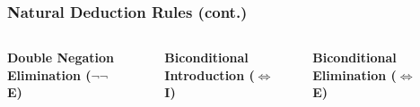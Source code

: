 \documentclass{beamer}
\begin{document}
  \begin{frame}
  \frametitle{Natural Deduction Rules (cont.)}
  \begin{columns}
  
  \textbf{Double Negation Elimination ($\neg\neg$ E)}
  \begin{prooftree}
  \end{prooftree}
  
  \vspace{10pt}
  
  \textbf{Biconditional Introduction ($\iff$ I)}
  \begin{prooftree}
  \end{prooftree}
  
  \textbf{Biconditional Elimination ($\iff$ E)}
  \begin{prooftree}
  \end{prooftree}
  \begin{prooftree}
  \end{prooftree}
  
  \end{columns}
  \end{frame}
\end{document}
